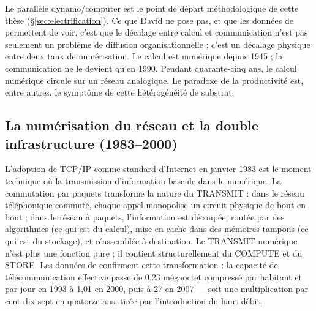 Le parallèle dynamo/computer est le point de départ méthodologique de cette thèse (§\ref{sec:electrification}). Ce que David ne pose pas, et que les données de \textcite{hilbert_worlds_2011} permettent de voir, c'est que le décalage entre calcul et communication n'est pas seulement un problème de diffusion organisationnelle ; c'est un décalage physique entre deux taux de numérisation. Le calcul est numérique depuis 1945 ; la communication ne le devient qu'en 1990. Pendant quarante-cinq ans, le calcul numérique circule sur un réseau analogique. Le paradoxe de la productivité est, entre autres, le symptôme de cette hétérogénéité de substrat.
 
 
 
\subsection{La numérisation du réseau et la double infrastructure (1983--2000)}\label{subsec:www}
 
L'adoption de TCP/IP comme standard d'Internet en janvier 1983 est le moment technique où la transmission d'information bascule dans le numérique. La commutation par paquets transforme la nature du TRANSMIT : dans le réseau téléphonique commuté, chaque appel monopolise un circuit physique de bout en bout ; dans le réseau à paquets, l'information est découpée, routée par des algorithmes (ce qui est du calcul), mise en cache dans des mémoires tampons (ce qui est du stockage), et réassemblée à destination. Le TRANSMIT numérique n'est plus une fonction pure ; il contient structurellement du COMPUTE et du STORE. Les données de \textcite{hilbert_worlds_2011} confirment cette transformation : la capacité de télécommunication effective passe de 0,23 mégaoctet compressé par habitant et par jour en 1993 à 1,01 en 2000, puis à 27 en 2007 --- soit une multiplication par cent dix-sept en quatorze ans, tirée par l'introduction du haut débit.
 
